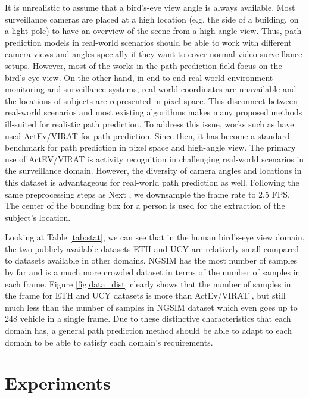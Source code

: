 \documentclass[sigconf]{acmart}
\begin{document}
It is unrealistic to assume that a bird's-eye view angle is always available. Most surveillance cameras are placed at a high location (e.g. the side of a building, on a light pole) to have an overview of the scene from a high-angle view. Thus, path prediction models in real-world scenarios should be able to work with different camera views and angles specially if they want to cover normal video surveillance setups. However, most of the works in the path prediction field focus on the bird's-eye view. On the other hand, in end-to-end real-world environment monitoring and surveillance systems, real-world coordinates are unavailable and the locations of subjects are represented in pixel space. This disconnect between real-world scenarios and most existing algorithms makes many proposed methods ill-suited for realistic path prediction. To address this issue, works such as \cite{liang2019peeking, liang2020garden, liang2020simaug, li2022graph} have used ActEv/VIRAT \cite{awad2018benchmarking} for path prediction. Since then, it has become a standard benchmark for path prediction in pixel space and high-angle view. The primary use of ActEV/VIRAT is activity recognition in challenging real-world scenarios in the surveillance domain. However, the diversity of camera angles and locations in this dataset is advantageous for real-world path prediction as well. Following the same preprocessing steps as Next \cite{liang2019peeking}, we downsample the frame rate to 2.5 FPS. The center of the bounding box for a person is used for the extraction of the subject's location.



Looking at Table \ref{tab:stat}, we can see that in the human bird's-eye view domain, the two publicly available datasets ETH \cite{pellegrini2009you} and UCY \cite{lerner2007crowds} are relatively small compared to datasets available in other domains. NGSIM \cite{NGSIM_i80, NGSIM_US101} has the most number of samples by far and is a much more crowded dataset in terms of the number of samples in each frame. Figure \ref{fig:data_dist} clearly shows that the number of samples in the frame for ETH and UCY datasets is more than ActEv/VIRAT \cite{awad2018benchmarking}, but still much less than the number of samples in NGSIM dataset which even goes up to 248 vehicle in a single frame. Due to these distinctive characteristics that each domain has, a general path prediction method should be able to adapt to each domain to be able to satisfy each domain's requirements.
 

\section{Experiments} \label{sec:Experiments}
\end{document}
